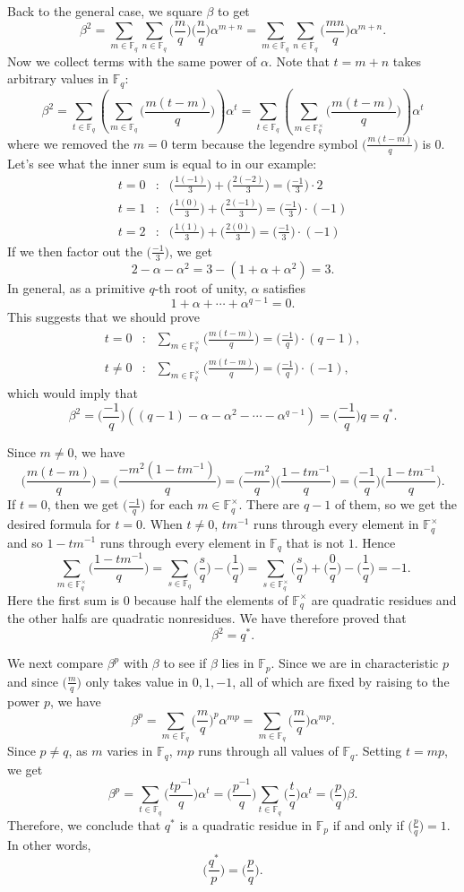 \documentclass{article}
\def\F{{\mathbb F}}
\def\F{{\mathbb F}}
\renewcommand{\lg}[2]{\Big(\frac{#1}{#2}\Big)}
\newcommand{\leg}[2]{\Big(\frac{#1}{#2}\Big)}
\begin{document}
Back to the general case, we square $\beta$ to get
$$\beta^2 = \sum_{m\in\F_q}\sum_{n\in\F_q}\leg{m}{q}\lg{n}{q}\alpha^{m+n} = \sum_{m\in\F_q}\sum_{n\in\F_q}\leg{mn}{q}\alpha^{m+n}.$$
Now we collect terms with the same power of $\alpha$. Note that $t=m+n$ takes arbitrary values in $\F_q$:
$$\beta^2 = \sum_{t\in\F_q} \left(\sum_{m\in\F_q} \lg{m(t-m)}{q}\right)\alpha^t = \sum_{t\in\F_q} \left(\sum_{m\in\F_q^\times} \lg{m(t-m)}{q}\right)\alpha^t$$ where we removed the $m = 0$ term because the legendre symbol $\leg{m(t-m)}{q}$ is $0$. Let's see what the inner sum is equal to in our example:
\begin{eqnarray*}
    t=0&\colon& \lg{1(-1)}{3} + \lg{2(-2)}{3} = \lg{-1}{3}\cdot 2\\
    t=1&\colon& \lg{1(0)}{3} + \lg{2(-1)}{3} = \lg{-1}{3}\cdot (-1)\\
    t=2&\colon& \lg{1(1)}{3} + \lg{2(0)}{3} = \lg{-1}{3}\cdot (-1)
\end{eqnarray*}
If we then factor out the $\lg{-1}{3}$, we get
$$2 - \alpha - \alpha^2 = 3 - (1 + \alpha + \alpha^2) = 3.$$
In general, as a primitive $q$-th root of unity, $\alpha$ satisfies $$1 + \alpha + \cdots + \alpha^{q-1} = 0.$$
This suggests that we should prove
\begin{eqnarray*}
    t=0&\colon& \sum_{m\in\F_q^\times} \lg{m(t-m)}{q} = \lg{-1}{q}\cdot (q-1),\\
    t\neq 0&\colon& \sum_{m\in\F_q^\times} \lg{m(t-m)}{q} = \lg{-1}{q}\cdot (-1),
\end{eqnarray*}
which would imply that
$$\beta^2 = \lg{-1}{q}\left((q-1) - \alpha - \alpha^2 - \cdots - \alpha^{q-1}\right) = \lg{-1}{q}q = q^*.$$

Since $m\neq0$, we have
$$\leg{m(t-m)}{q} = \leg{-m^2(1-tm^{-1})}{q} = \leg{-m^2}{q}\leg{1-tm^{-1}}{q} = \leg{-1}{q}\leg{1-tm^{-1}}{q}.$$ 
If $t = 0$, then we get $\lg{-1}{q}$ for each $m\in\F_q^\times$. There are $q-1$ of them, so we get the desired formula for $t = 0$. When $t\neq 0$, $tm^{-1}$ runs through every element in $\F_q^\times$ and so $1 - tm^{-1}$ runs through every element in $\F_q$ that is not $1$. Hence
$$\sum_{m\in\F_q^\times}\leg{1-tm^{-1}}{q} = \sum_{s\in\F_q}\leg{s}{q} - \leg{1}{q} = \sum_{s\in\F_q^\times}\leg{s}{q} + \leg{0}{q} - \leg{1}{q} = -1.$$
Here the first sum is $0$ because half the elements of $\F_q^\times$ are quadratic residues and the other halfs are quadratic nonresidues. We have therefore proved that 
$$\beta^2 = q^*.$$


We next compare $\beta^p$ with $\beta$ to see if $\beta$ lies in $\F_p$. Since we are in characteristic $p$ and since $\lg{m}{q}$ only takes value in $0,1,-1$, all of which are fixed by raising to the power $p$, we have
$$\beta^p = \sum_{m\in\F_q}\leg{m}{q}^p\alpha^{mp} = \sum_{m\in\F_q}\leg{m}{q}\alpha^{mp}.$$
Since $p\neq q$, as $m$ varies in $\F_q$, $mp$ runs through all values of $\F_q$. Setting $t = mp$, we get
$$\beta^p = \sum_{t\in\F_q} \lg{tp^{-1}}{q}\alpha^t = \lg{p^{-1}}{q}\sum_{t\in\F_q} \lg{t}{q}\alpha^t = \lg{p}{q}\beta.$$
Therefore, we conclude that $q^*$ is a quadratic residue in $\F_p$ if and only if $\lg{p}{q} = 1$. In other words,
$$\lg{q^*}{p} = \lg{p}{q}.$$
\end{document}
